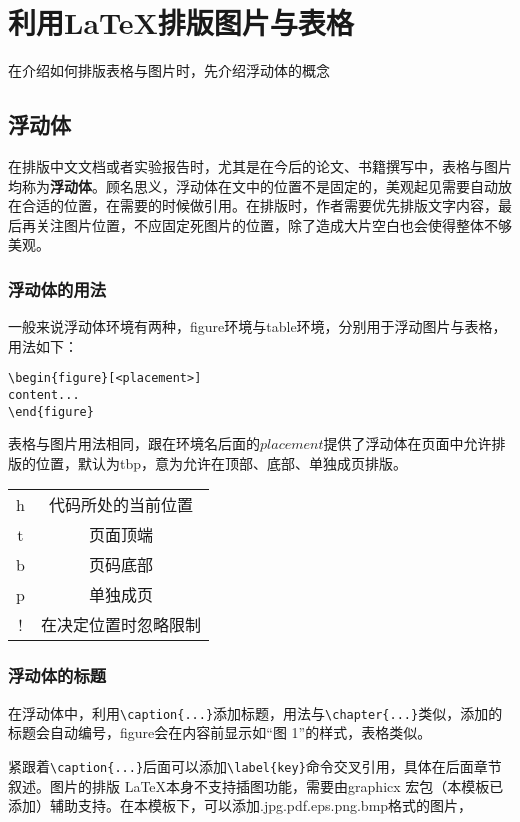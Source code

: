 \chapter{利用\LaTeX 排版图片与表格}
在介绍如何排版表格与图片时，先介绍浮动体的概念
\section{浮动体}
在排版中文文档或者实验报告时，尤其是在今后的论文、书籍撰写中，表格与图片均称为\textbf{浮动体}。顾名思义，浮动体在文中的位置不是固定的，美观起见需要自动放在合适的位置，在需要的时候做引用。在排版时，作者需要优先排版文字内容，最后再关注图片位置，不应固定死图片的位置，除了造成大片空白也会使得整体不够美观。
\subsection{浮动体的用法}
一般来说浮动体环境有两种，figure环境与table环境，分别用于浮动图片与表格，用法如下：
\begin{verbatim}
\begin{figure}[<placement>]
content...
\end{figure}
\end{verbatim}

表格与图片用法相同，跟在环境名后面的$placement$提供了浮动体在页面中允许排版的位置，默认为tbp，意为允许在顶部、底部、单独成页排版。
\begin{table}[h!]
\centering
\begin{tabular}{cc}
\hline
h&代码所处的当前位置\\
t&页面顶端\\
b&页码底部\\
p&单独成页\\
!&在决定位置时忽略限制\\
\hline
\end{tabular}
\end{table}
\subsection{浮动体的标题}
在浮动体中，利用\verb|\caption{...}|添加标题，用法与\verb|\chapter{...}|类似，添加的标题会自动编号，figure会在内容前显示如“图 1”的样式，表格类似。

紧跟着\verb|\caption{...}|后面可以添加\verb|\label{key}|命令交叉引用，具体在后面章节叙述。{图片的排版}
\LaTeX 本身不支持插图功能，需要由graphicx 宏包（本模板已添加）辅助支持。在本模板下，可以添加.jpg.pdf.eps.png.bmp格式的图片，

